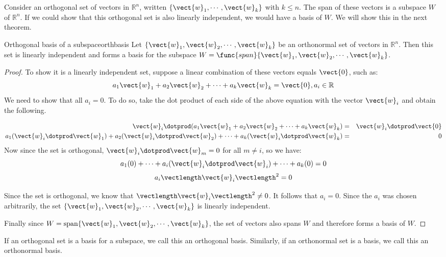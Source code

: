 Consider an orthogonal set of vectors in $\mathbb{R}^n$, written $\{
\vect{w}_1, \cdots, \vect{w}_k \}$ with $k \leq n$. The span of these
vectors is a subspace $W$ of $\mathbb{R}^n$. If we
could show that this orthogonal set is also linearly independent, we
would have a basis of $W$. We will show this in the next theorem.

\begin{theorem}{Orthogonal basis of a subspace}{orthbasis}
Let $ \{ \vect{w}_1, \vect{w}_2, \cdots, \vect{w}_k \}$ be an
orthonormal set of vectors in $\mathbb{R}^n$. Then this set is
linearly independent and forms a basis for the subspace $W =
\func{span} \{ \vect{w}_1, \vect{w}_2, \cdots, \vect{w}_k \}$.
\end{theorem}

\begin{proof}
To show it is a linearly independent set, suppose a linear combination
of these vectors equals $\vect{0}$, such as:
\[
a_1 \vect{w}_1 + a_2 \vect{w}_2 + \cdots + a_k \vect{w}_k = \vect{0}, a_i \in \mathbb{R} 
\]
We need to show that all $a_i = 0$. To do so, take the dot product of
each side of the above equation with the vector $\vect{w}_i$ and obtain the following. 

\begin{eqnarray*}
\vect{w}_i \dotprod (a_1 \vect{w}_1 + a_2 \vect{w}_2 + \cdots + a_k \vect{w}_k ) &=& \vect{w}_i \dotprod \vect{0}\\
a_1 (\vect{w}_i \dotprod \vect{w}_1) + a_2 (\vect{w}_i \dotprod \vect{w}_2) + \cdots + a_k (\vect{w}_i \dotprod \vect{w}_k)  &=& 0 
\end{eqnarray*}
Now since the set is orthogonal, $\vect{w}_i \dotprod \vect{w}_m = 0$ for all $m \neq i$, so we have:
\[
a_1 (0) + \cdots + a_i(\vect{w}_i \dotprod \vect{w}_i) + \cdots + a_k (0) = 0
\]
\[
a_i \vectlength \vect{w}_i \vectlength^2 = 0
\]

Since the set is orthogonal, we know that $\vectlength \vect{w}_i \vectlength^2  \neq 0$. It follows that $a_i =0$. Since the $a_i$ was chosen arbitrarily, the set $\{ \vect{w}_1, \vect{w}_2, \cdots, \vect{w}_k \}$ is linearly independent. 

Finally since $W = \mbox{span} \{ \vect{w}_1, \vect{w}_2, \cdots,
\vect{w}_k \}$, the set of vectors also spans $W$ and therefore forms a basis of $W$. 

\end{proof}

If an orthogonal set is a basis for a subspace, we call this an
orthogonal basis. Similarly, if an orthonormal set is a basis, we call
this an orthonormal basis.

